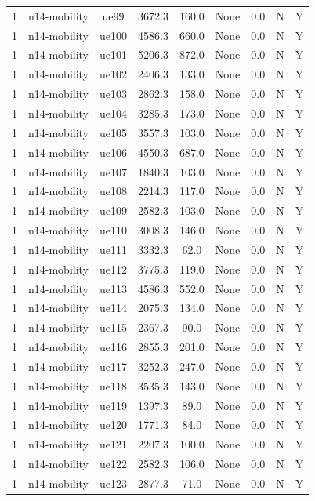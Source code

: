 \begin{table}[ht]
\begin{tabular}{|c|c|c|c|c|c|c|c|c|}
1 & n14-mobility & ue99 & 3672.3 & 160.0 & None & 0.0 & N & Y \\
1 & n14-mobility & ue100 & 4586.3 & 660.0 & None & 0.0 & N & Y \\
1 & n14-mobility & ue101 & 5206.3 & 872.0 & None & 0.0 & N & Y \\
1 & n14-mobility & ue102 & 2406.3 & 133.0 & None & 0.0 & N & Y \\
1 & n14-mobility & ue103 & 2862.3 & 158.0 & None & 0.0 & N & Y \\
1 & n14-mobility & ue104 & 3285.3 & 173.0 & None & 0.0 & N & Y \\
1 & n14-mobility & ue105 & 3557.3 & 103.0 & None & 0.0 & N & Y \\
1 & n14-mobility & ue106 & 4550.3 & 687.0 & None & 0.0 & N & Y \\
1 & n14-mobility & ue107 & 1840.3 & 103.0 & None & 0.0 & N & Y \\
1 & n14-mobility & ue108 & 2214.3 & 117.0 & None & 0.0 & N & Y \\
1 & n14-mobility & ue109 & 2582.3 & 103.0 & None & 0.0 & N & Y \\
1 & n14-mobility & ue110 & 3008.3 & 146.0 & None & 0.0 & N & Y \\
1 & n14-mobility & ue111 & 3332.3 & 62.0 & None & 0.0 & N & Y \\
1 & n14-mobility & ue112 & 3775.3 & 119.0 & None & 0.0 & N & Y \\
1 & n14-mobility & ue113 & 4586.3 & 552.0 & None & 0.0 & N & Y \\
1 & n14-mobility & ue114 & 2075.3 & 134.0 & None & 0.0 & N & Y \\
1 & n14-mobility & ue115 & 2367.3 & 90.0 & None & 0.0 & N & Y \\
1 & n14-mobility & ue116 & 2855.3 & 201.0 & None & 0.0 & N & Y \\
1 & n14-mobility & ue117 & 3252.3 & 247.0 & None & 0.0 & N & Y \\
1 & n14-mobility & ue118 & 3535.3 & 143.0 & None & 0.0 & N & Y \\
1 & n14-mobility & ue119 & 1397.3 & 89.0 & None & 0.0 & N & Y \\
1 & n14-mobility & ue120 & 1771.3 & 84.0 & None & 0.0 & N & Y \\
1 & n14-mobility & ue121 & 2207.3 & 100.0 & None & 0.0 & N & Y \\
1 & n14-mobility & ue122 & 2582.3 & 106.0 & None & 0.0 & N & Y \\
1 & n14-mobility & ue123 & 2877.3 & 71.0 & None & 0.0 & N & Y \\

\end{tabular}
\end{table}
